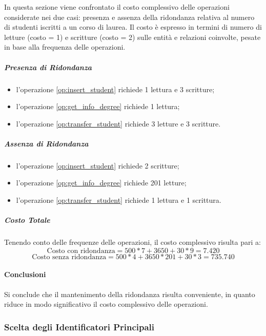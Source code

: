 \documentclass[a4paper,11pt]{article}
\begin{document}
In questa sezione viene confrontato il costo complessivo delle operazioni considerate nei due casi: presenza e assenza della ridondanza relativa al numero di studenti iscritti a un corso di laurea.
Il costo è espresso in termini di numero di letture (costo = 1) e scritture (costo = 2) sulle entità e relazioni coinvolte, pesate in base alla frequenza delle operazioni.


\subparagraph{Presenza di Ridondanza}

\begin{itemize}
    \item l'operazione \ref{op:insert_student} richiede 1 lettura e 3 scritture;
    \item l'operazione \ref{op:get_info_degree} richiede 1 lettura;
    \item l'operazione \ref{op:transfer_student} richiede 3 letture e 3 scritture.
\end{itemize}


\subparagraph{Assenza di Ridondanza}

\begin{itemize}
    \item l'operazione \ref{op:insert_student} richiede 2 scritture;
    \item l'operazione \ref{op:get_info_degree} richiede 201 letture;
    \item l'operazione \ref{op:transfer_student} richiede 1 lettura e 1 scrittura.
\end{itemize}


\subparagraph{Costo Totale}

Tenendo conto delle frequenze delle operazioni, il costo complessivo risulta pari a:
$$ \text{Costo con ridondanza} = 500*7+3650+30*9 = 7.420$$
$$ \text{Costo senza ridondanza} = 500*4+3650*201+30*3 = 735.740 $$


\paragraph{Conclusioni}
Si conclude che il mantenimento della ridondanza risulta conveniente, in quanto riduce in modo significativo il costo complessivo delle operazioni.


\subsubsection{Scelta degli Identificatori Principali}
\end{document}
